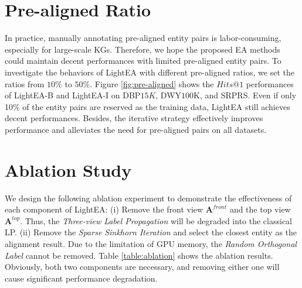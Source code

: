 \documentclass[11pt]{article}
\begin{document}
\section{Pre-aligned Ratio}
\label{sec:pre}
In practice, manually annotating pre-aligned entity pairs is labor-consuming, especially for large-scale KGs.
Therefore, we hope the proposed EA methods could maintain decent performances with limited pre-aligned entity pairs.
To investigate the behaviors of LightEA with different pre-aligned ratios, we set the ratios from $10\%$ to $50\%$.
Figure \ref{fig:pre-aligned} shows the $Hits@1$ performances of LightEA-B and LightEA-I on DBP$15K$, DWY$100$K, and SRPRS.
Even if only 10\% of the entity pairs are reserved as the training data, LightEA still achieves decent performances.
Besides, the iterative strategy effectively improves performance and alleviates the need for pre-aligned pairs on all datasets.

\section{Ablation Study}
\label{sec:able}
We design the following ablation experiment to demonstrate the effectiveness of each component of LightEA:
(i) Remove the front view $\bm A^{front}$ and the top view $\bm A^{top}$. Thus, the \emph{Three-view Label Propagation} will be degraded into the classical LP.
(ii) Remove the \emph{Sparse Sinkhorn Iteration} and select the closest entity as the alignment result.
Due to the limitation of GPU memory, the \emph{Random Orthogonal Label} cannot be removed.
Table \ref{table:ablation} shows the ablation results.
Obviously, both two components are necessary, and removing either one will cause significant performance degradation.

\begin{table}[b]
\renewcommand\arraystretch{1.2}
\caption{Ablation study of LightEA.}
\label{table:ablation}
\end{table}
\end{document}
